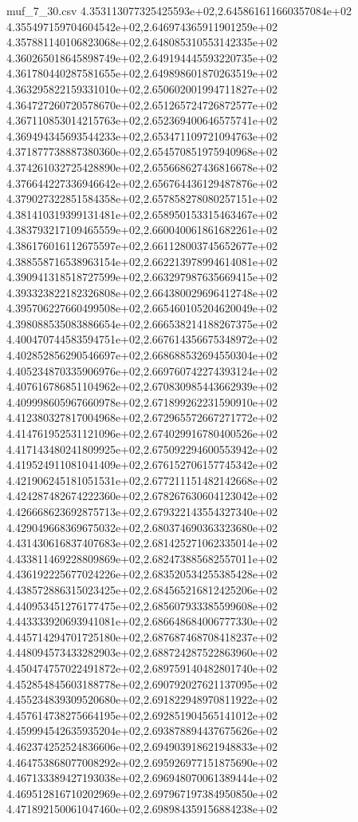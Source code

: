 \begin{filecontents*}{muf_7_30.csv}
4.353113077325425593e+02,2.645861611660357084e+02
4.355497159704604542e+02,2.646974365911901259e+02
4.357881140106823068e+02,2.648085310553142335e+02
4.360265018645898749e+02,2.649194445593220735e+02
4.361780440287581655e+02,2.649898601870263519e+02
4.363295822159331010e+02,2.650602001994711827e+02
4.364727260720578670e+02,2.651265724726872577e+02
4.367110853014215763e+02,2.652369400646575741e+02
4.369494345693544233e+02,2.653471109721094763e+02
4.371877738887380360e+02,2.654570851975940968e+02
4.374261032725428890e+02,2.655668627436816678e+02
4.376644227336946642e+02,2.656764436129487876e+02
4.379027322851584358e+02,2.657858278080257151e+02
4.381410319399131481e+02,2.658950153315463467e+02
4.383793217109465559e+02,2.660040061861682261e+02
4.386176016112675597e+02,2.661128003745652677e+02
4.388558716538963154e+02,2.662213978994614081e+02
4.390941318518727599e+02,2.663297987635669415e+02
4.393323822182326808e+02,2.664380029696412748e+02
4.395706227660499508e+02,2.665460105204620049e+02
4.398088535083886654e+02,2.666538214188267375e+02
4.400470744583594751e+02,2.667614356675348972e+02
4.402852856290546697e+02,2.668688532694550304e+02
4.405234870335906976e+02,2.669760742274393124e+02
4.407616786851104962e+02,2.670830985443662939e+02
4.409998605967660978e+02,2.671899262231590910e+02
4.412380327817004968e+02,2.672965572667271772e+02
4.414761952531121096e+02,2.674029916780400526e+02
4.417143480241809925e+02,2.675092294600553942e+02
4.419524911081041409e+02,2.676152706157745342e+02
4.421906245181051531e+02,2.677211151482142668e+02
4.424287482674222360e+02,2.678267630604123042e+02
4.426668623692875713e+02,2.679322143554327340e+02
4.429049668369675032e+02,2.680374690363323680e+02
4.431430616837407683e+02,2.681425271062335014e+02
4.433811469228809869e+02,2.682473885682557011e+02
4.436192225677024226e+02,2.683520534255385428e+02
4.438572886315023425e+02,2.684565216812425206e+02
4.440953451276177475e+02,2.685607933385599608e+02
4.443333920693941081e+02,2.686648684006777330e+02
4.445714294701725180e+02,2.687687468708418237e+02
4.448094573433282903e+02,2.688724287522863960e+02
4.450474757022491872e+02,2.689759140482801740e+02
4.452854845603188778e+02,2.690792027621137095e+02
4.455234839309520680e+02,2.691822948970811922e+02
4.457614738275664195e+02,2.692851904565141012e+02
4.459994542635935204e+02,2.693878894437675626e+02
4.462374252524836606e+02,2.694903918621948833e+02
4.464753868077008292e+02,2.695926977151875690e+02
4.467133389427193038e+02,2.696948070061389444e+02
4.469512816710202969e+02,2.697967197384950850e+02
4.471892150061047460e+02,2.698984359156884238e+02

\end{filecontents*}
